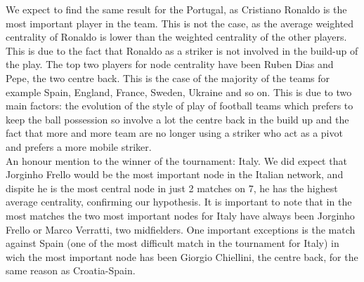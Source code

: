 \documentclass[12pt, a4paper]{article}
\begin{document}
We expect to find the same result for the Portugal, as Cristiano Ronaldo is the most important player in the team. This is not the case, as the average weighted centrality of Ronaldo is lower than the weighted centrality of the other players. This is due to the fact that Ronaldo as a striker is not involved in the build-up of the play. The top two players for node centrality have been Ruben Dias and Pepe, the two centre back. This is the case of the majority of the teams for example Spain, England, France, Sweden, Ukraine and so on. This is due to two main factors: the evolution of the style of play of football teams which prefers to keep the ball possession so involve a lot the centre back in the build up and the fact that more and more team are no longer using a striker who act as a pivot and prefers a more mobile striker. \\
An honour mention to the winner of the tournament: Italy. We did expect that Jorginho Frello would be the most important node in the Italian network, and dispite he is the most central node in just 2 matches on 7, he has the highest average centrality, confirming our hypothesis. It is important to note that in the most matches the two most important nodes for Italy have always been Jorginho Frello or Marco Verratti, two midfielders. One important exceptions is the match against Spain (one of the most difficult match in the tournament for Italy) in wich the most important node has been Giorgio Chiellini, the centre back, for the same reason as Croatia-Spain. \\

\end{document}
